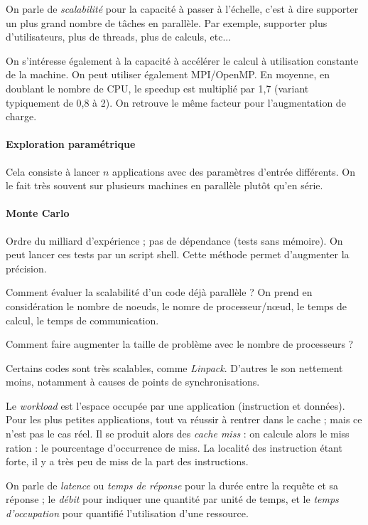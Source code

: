 \documentclass{article}
\begin{document}
On parle de \emph{scalabilité} pour la capacité à passer à l'échelle, c'est à dire supporter un plus grand nombre de tâches en parallèle. Par exemple, supporter plus d'utilisateurs, plus de threads, plus de calculs, etc... 

On s'intéresse également à la capacité à accélérer le calcul à utilisation constante de la machine. On peut utiliser également MPI/OpenMP. En moyenne, en doublant le nombre de CPU, le speedup est multiplié par 1,7 (variant typiquement de 0,8 à 2). On retrouve le même facteur pour l'augmentation de charge.



\paragraph{Exploration paramétrique} Cela consiste à lancer $n$ applications avec des paramètres d'entrée différents. On le fait très souvent sur plusieurs machines en parallèle plutôt qu'en série.

\paragraph{Monte Carlo} Ordre du milliard d'expérience ; pas de dépendance (tests sans mémoire). On peut lancer ces tests par un script shell. Cette méthode permet d'augmenter la précision.
\bigskip

Comment évaluer la scalabilité d'un code déjà parallèle ? On prend en considération le nombre de noeuds, le nomre de processeur/nœud, le temps de calcul, le temps de communication.

Comment faire augmenter la taille de problème avec le nombre de processeurs ?

Certains codes sont très scalables, comme \emph{Linpack}. D'autres le son nettement moins, notamment à causes de points de synchronisations.
\bigskip

Le \emph{workload} est l'espace occupée par une application (instruction et données). Pour les plus petites applications, tout va réussir à rentrer dans le cache ; mais ce n'est pas le cas réel. Il se produit alors des \emph{cache miss} : on calcule alors le miss ration : le pourcentage d'occurrence de miss. La localité des instruction étant forte, il y a très peu de miss de la part des instructions.


On parle de \emph{latence} ou \emph{temps de réponse} pour la durée entre la requête et sa réponse ; le \emph{débit} pour indiquer une quantité par unité de temps, et le \emph{temps d'occupation} pour quantifié l'utilisation d'une ressource.
\end{document}
